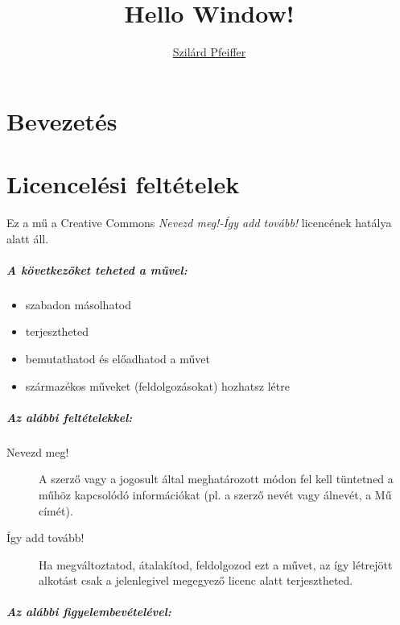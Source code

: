 \documentclass[a4paper, titlepage]{report}
\author{
\href{http://pfeifferszilard.hu}{Szilárd Pfeiffer}
}
\title{Hello Window!}
\begin{document}
\maketitle

\tableofcontents
\newpage
{}

\chapter{Bevezetés}



\appendix

\chapter{Licencelési feltételek}

Ez a mű a Creative Commons \textit{Nevezd meg!-Így add tovább!} licencének hatálya alatt áll.

\paragraph{A következőket teheted a művel:}

\begin{itemize}
 \item szabadon másolhatod
 \item terjesztheted
 \item bemutathatod és előadhatod a művet 
 \item származékos műveket (feldolgozásokat) hozhatsz létre
\end{itemize}

\paragraph{Az alábbi feltételekkel:}

\begin{description}
 \item[Nevezd meg!] A szerző vagy a jogosult által meghatározott módon fel kell tüntetned a műhöz kapcsolódó információkat (pl. a szerző nevét vagy álnevét, a Mű címét).
 \item[Így add tovább!] Ha megváltoztatod, átalakítod, feldolgozod ezt a művet, az így létrejött alkotást csak a jelenlegivel megegyező licenc alatt terjesztheted.
\end{description}

\paragraph{Az alábbi figyelembevételével:}
\end{document}

